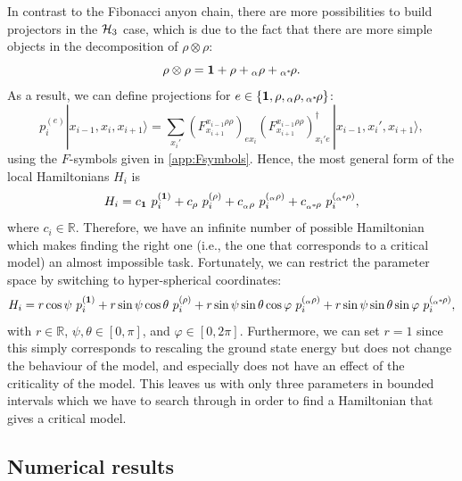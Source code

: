 In contrast to the Fibonacci anyon chain, there are more possibilities to build projectors in the ${\mathcal{H}_3}$ case, which is due to the fact that there are more simple objects in the decomposition of $\rho\otimes\rho$:
\begin{equation}
\rho\otimes\rho=\mathbf{1}+\rho+{{}_\alpha\rho}+{}_{\alpha^*}\!\rho.
\end{equation}
As a result, we can define projections for $e\in\{\mathbf{1},\rho,{{}_\alpha\rho},{}_{\alpha^*}\!\rho\}$:
\begin{equation}
p_i^{(e)}|x_{i-1},x_i,x_{i+1}\rangle=\sum_{x_i'}\left(F_{x_{i+1}}^{x_{i-1}\rho\rho}\right)_{ex_i}\left(F_{x_{i+1}}^{x_{i-1}\rho\rho}\right)^\dagger_{x_i'e}\,|x_{i-1},x_i',x_{i+1}\rangle,
\end{equation}
using the $F$-symbols given in \cref{app:Fsymbols}. Hence, the most general form of the local Hamiltonians $H_i$ is
\begin{equation}
H_i=c_\mathbf{1}\ p_i^{(\mathbf{1})}+c_\rho\  p_i^{(\rho)}+c_{\alpharho}\ p_i^{(\alpharho)}+c_{\alphastarrho}\  p_i^{(\alphastarrho)},
\end{equation}
where $c_i\in\mathbb{R}$. Therefore, we have an infinite number of possible Hamiltonian which makes finding the right one (i.e., the one that corresponds to a critical model) an almost impossible task. Fortunately, we can restrict the parameter space by switching to hyper-spherical coordinates:
\begin{equation}
\label{eq:fullham}
H_i=r\cos\psi\ p_i^{(\mathbf{1})}+r\sin\psi\cos\theta\  p_i^{(\rho)}+r\sin\psi\sin\theta\cos\varphi\ p_i^{(\alpharho)}+r\sin\psi\sin\theta\sin\varphi\  p_i^{(\alphastarrho)},
\end{equation}
with $r\in\mathbb{R}$, $\psi,\theta\in [0,\pi]$, and $\varphi\in[0,2\pi]$. Furthermore, we can set $r=1$ since this simply corresponds to rescaling the ground state energy but does not change the behaviour of the model, and especially does not have an effect of the criticality of the model. This leaves us with only three parameters in bounded intervals which we have to search through in order to find a Hamiltonian that gives a critical model.


\subsection*{Numerical results}

